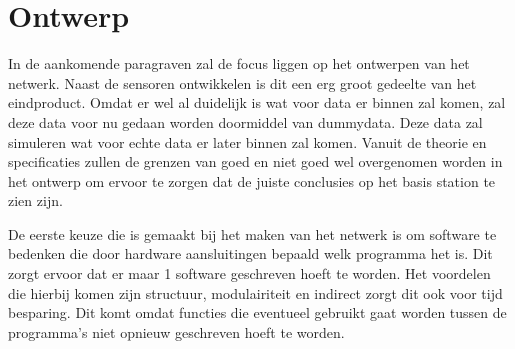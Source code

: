 \section{Ontwerp}
In de aankomende paragraven zal de focus liggen op het ontwerpen van het netwerk. Naast de sensoren ontwikkelen is dit een erg groot gedeelte
van het eindproduct. Omdat er wel al duidelijk is wat voor data er binnen zal komen, zal deze data voor nu gedaan worden doormiddel van dummydata. 
Deze data zal simuleren wat voor echte data er later binnen zal komen. Vanuit de theorie en specificaties zullen de grenzen van goed en niet goed wel overgenomen worden 
in het ontwerp om ervoor te zorgen dat de juiste conclusies op het basis station te zien zijn. 

De eerste keuze die is gemaakt bij het maken van het netwerk is om software te bedenken die door hardware aansluitingen bepaald welk programma het is.
Dit zorgt ervoor dat er maar 1 software geschreven hoeft te worden. Het voordelen die hierbij komen zijn structuur, modulairiteit en indirect zorgt dit ook voor 
tijd besparing. Dit komt omdat functies die eventueel gebruikt gaat worden tussen de programma's niet opnieuw geschreven hoeft te worden.




